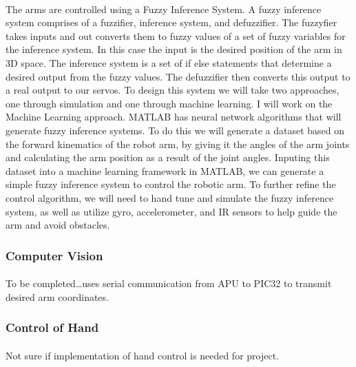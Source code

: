 \documentclass[letterpaper]{article}
\begin{document}
\paragraph{} The arms are controlled using a Fuzzy Inference System. A fuzzy
inference system comprises of a fuzzifier, inference system, and defuzzifier.
The fuzzyfier takes inputs and out converts them to fuzzy values of a set of
fuzzy variables for the inference system. In this case the input is the desired
position of the arm in 3D space. The inference system is a set of if else
statements that determine a desired output from the fuzzy values. The
defuzzifier then converts this output to a real output to our
servos\cite{fuzzy2011}. To design this system we will take two approaches, one
through simulation and one through machine learning. I will work on the Machine
Learning approach. MATLAB has neural network algorithms that will generate fuzzy
inference systems. To do this we will generate a dataset based on the forward
kinematics of the robot arm, by giving it the angles of the arm joints and
calculating the arm position as a result of the joint angles. Inputing this
dataset into a machine learning framework in MATLAB, we can generate a simple
fuzzy inference system to control the robotic arm\cite{fuzzymatlab}. To further
refine the control algorithm, we will need to hand tune and simulate the fuzzy
inference system, as well as utilize gyro, accelerometer, and IR sensors to help
guide the arm and avoid obstacles.

\subsubsection{Computer Vision}
\paragraph{} To be completed\dots uses serial communication from APU to PIC32 to
transmit desired arm coordinates.

\subsubsection{Control of Hand}
\paragraph{} Not sure if implementation of hand control is needed for project.

\printbibliography
\end{document}
